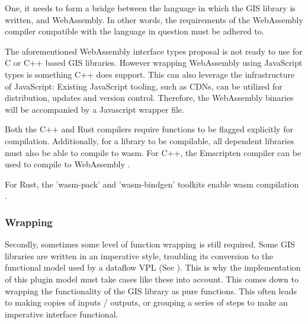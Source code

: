 One, it needs to form a bridge between the language in which the GIS library is written, and WebAssembly. 
In other words, the requirements of the WebAssembly compiler compatible with the language in question must be adhered to.
 
The aforementioned WebAssembly interface types proposal is not ready to use for C or C++ based GIS libraries.  
However wrapping WebAssembly using JavaScript types is something C++ does support. 
This can also leverage the infrastructure of JavaScript:
Existing JavaScript tooling, such as \ac{CDN}s, can be utilized for distribution, updates and version control.
Therefore, the WebAssembly binaries will be accompanied by a Javascript wrapper file.

Both the C++ and Rust compilers require functions to be flagged explicitly for compilation. 
Additionally, for a library to be compilable, all dependent libraries must also be able to compile to wasm.
For C++, the Emscripten compiler can be used to compile to WebAssembly \citep*{emscripten_organization_emscripten_2022}. 

For Rust, the 'wasm-pack' and 'wasm-bindgen' toolkits enable \ac{wasm} compilation \citep{contributors_wasm-bindgen_2022,contributors_wasm-pack_2022}.

\subsubsection{Wrapping}

Secondly, sometimes some level of function wrapping is still required. 
Some GIS libraries are written in an imperative style, troubling its conversion to the functional model used by a dataflow VPL (See ).
This is why the implementation of this plugin model must take cases like these into account. 
This comes down to wrapping the functionality of the GIS library as pure functions. 
This often leads to making copies of inputs / outputs, or grouping a series of steps to make an imperative interface functional.

